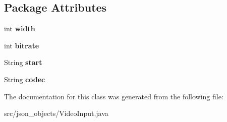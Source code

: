 \subsection*{Package Attributes}
\begin{DoxyCompactItemize}
\item 
\hypertarget{classjson__objects_1_1_video_input_a28fa75e9641349062139f4c948fdd29d}{
int {\bfseries width}}
\label{classjson__objects_1_1_video_input_a28fa75e9641349062139f4c948fdd29d}

\item 
\hypertarget{classjson__objects_1_1_video_input_aa3c48f6de81396d0b73bb5d302cf9ab1}{
int {\bfseries bitrate}}
\label{classjson__objects_1_1_video_input_aa3c48f6de81396d0b73bb5d302cf9ab1}

\item 
\hypertarget{classjson__objects_1_1_video_input_aba1b54c7f10dbefffca250a607aa3600}{
String {\bfseries start}}
\label{classjson__objects_1_1_video_input_aba1b54c7f10dbefffca250a607aa3600}

\item 
\hypertarget{classjson__objects_1_1_video_input_a94632c308e6cb2df875e78798b16a7c9}{
String {\bfseries codec}}
\label{classjson__objects_1_1_video_input_a94632c308e6cb2df875e78798b16a7c9}

\end{DoxyCompactItemize}


The documentation for this class was generated from the following file:\begin{DoxyCompactItemize}
\item 
src/json\_\-objects/VideoInput.java\end{DoxyCompactItemize}
